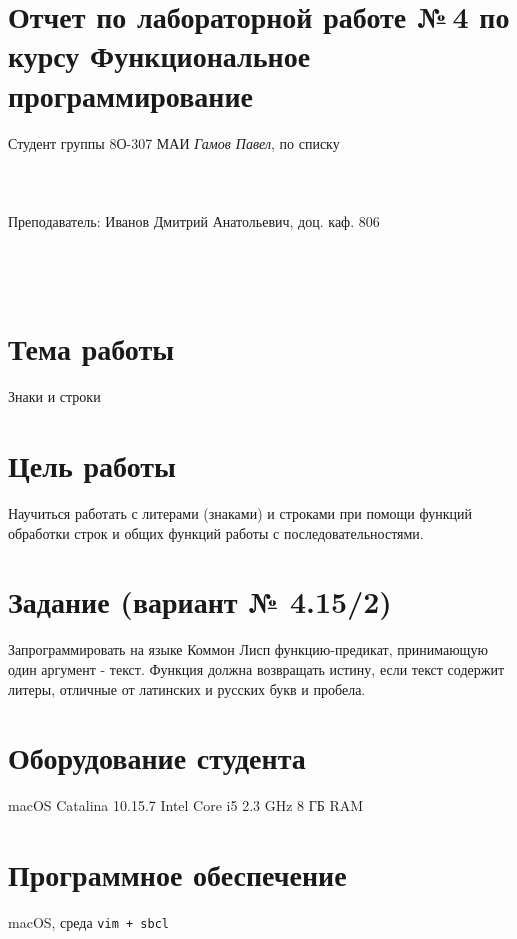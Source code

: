\documentclass[15pt]{extarticle}
\begin{document}
\section*{Отчет по лабораторной работе №\,4
по курсу \guillemotleft  Функциональное программирование\guillemotright}

\begin{flushright}
Студент группы 8О-307 МАИ \textit{Гамов Павел},  по списку \\
 \\
 \\
\ \\
Преподаватель: Иванов Дмитрий Анатольевич, доц. каф. 806 \\
 \\
 \\
 \\

\end{flushright}

\section{Тема работы}
Знаки и строки

\section{Цель работы}
Научиться работать с литерами (знаками) и строками при помощи функций обработки строк и общих функций работы с последовательностями.

\section{Задание (вариант № 4.15/2)}
Запрограммировать на языке Коммон Лисп функцию-предикат, принимающую один аргумент - текст.
Функция должна возвращать истину, если текст содержит литеры, отличные от латинских и русских букв и пробела.


\section{Оборудование студента}
macOS Catalina 10.15.7 Intel Core i5 2.3 GHz 8 ГБ RAM

\section{Программное обеспечение}
macOS, среда {\tt vim + sbcl}
\end{document}
